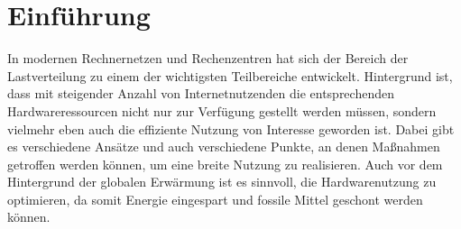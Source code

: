 %
%

\chapter{Einführung}
\label{cha:introduction}

In modernen Rechnernetzen und Rechenzentren hat sich der Bereich der Lastverteilung zu einem der wichtigsten Teilbereiche entwickelt. Hintergrund ist, dass mit steigender Anzahl von Internetnutzenden die entsprechenden Hardwareressourcen nicht nur zur Verfügung gestellt werden müssen, sondern vielmehr eben auch die effiziente Nutzung von Interesse geworden ist.\cite{tanenbaum2007modern} Dabei gibt es verschiedene Ansätze und auch verschiedene Punkte, an denen Maßnahmen getroffen werden können, um eine breite Nutzung zu realisieren. Auch vor dem Hintergrund der globalen Erwärmung ist es sinnvoll, die Hardwarenutzung zu optimieren, da somit Energie eingespart und fossile Mittel geschont werden können. \cite{barroso2007case} \newline \newline

